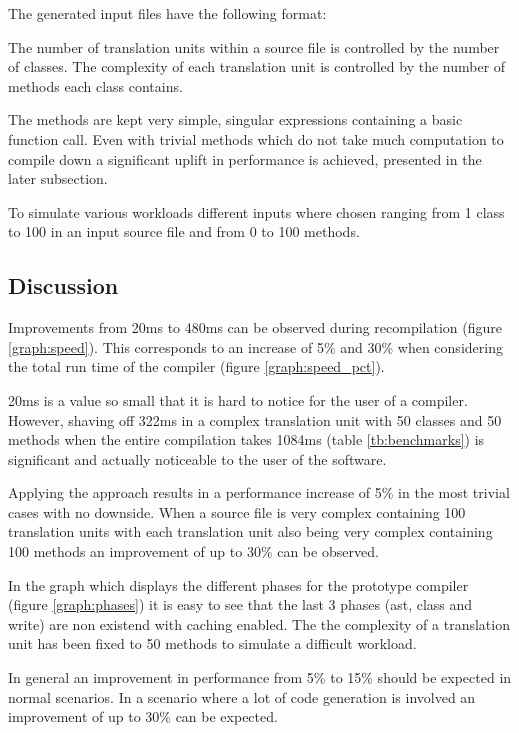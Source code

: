 \documentclass{VUMIFPSbakalaurinis}
\begin{document}
The generated input files have the following format:



The number of translation units within a source file is controlled by the number of classes.
The complexity of each translation unit is controlled by the number of methods each class contains.

The methods are kept very simple, singular expressions containing a basic function call.
Even with trivial methods which do not take much computation to compile down a significant uplift in performance is achieved, presented in the later subsection.

To simulate various workloads different inputs where chosen ranging from 1 class to 100 in an input source file and from 0 to 100 methods.

\subsection{Discussion}

Improvements from 20ms to 480ms can be observed during recompilation (figure \ref{graph:speed}).
This corresponds to an increase of 5\% and 30\% when considering the total run time of the compiler (figure \ref{graph:speed_pct}).

20ms is a value so small that it is hard to notice for the user of a compiler.
However, shaving off 322ms in a complex translation unit with 50 classes and 50 methods when the entire compilation takes 1084ms (table \ref{tb:benchmarks}) is significant and actually noticeable to the user of the software.

Applying the approach results in a performance increase of 5\% in the most trivial cases with no downside.
When a source file is very complex containing 100 translation units with each translation unit also being very complex containing 100 methods an improvement of up to 30\% can be observed.

In the graph which displays the different phases for the prototype compiler (figure \ref{graph:phases}) it is easy to see that the last 3 phases (ast, class and write) are non existend with caching enabled.
The the complexity of a translation unit has been fixed to 50 methods to simulate a difficult workload.

In general an improvement in performance from 5\% to 15\% should be expected in normal scenarios.
In a scenario where a lot of code generation is involved an improvement of up to 30\% can be expected.
\end{document}
